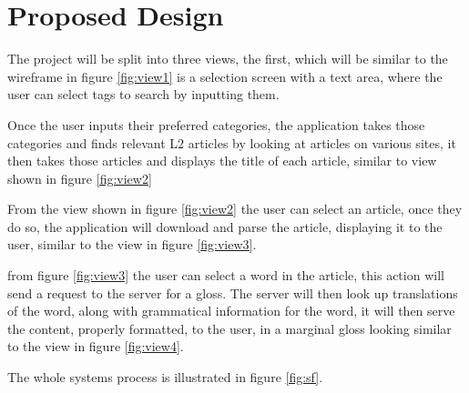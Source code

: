 \chapter{Proposed Design}

The project will be split into three views, the first, which will be similar to the wireframe in figure \ref{fig:view1} is a selection screen with a text area, where the user can select tags to search by inputting them.



Once the user inputs their preferred categories, the application takes those categories and finds relevant L2 articles by looking at articles on various sites, it then takes those articles and displays the title of each article, similar to view shown in figure \ref{fig:view2}



From the view shown in figure \ref{fig:view2} the user can select an article, once they do so, the application will download and parse the article, displaying it to the user, similar to the view in figure \ref{fig:view3}.



from figure \ref{fig:view3} the user can select a word in the article, this action will send a request to the server for a gloss. The server will then look up translations of the word, along with grammatical information for the word, it will then serve the content, properly formatted, to the user, in a marginal gloss looking similar to the view in figure \ref{fig:view4}.



The whole systems process is illustrated in figure \ref{fig:sf}.
	


